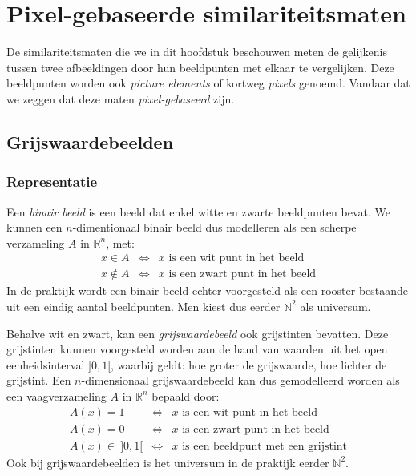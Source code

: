 \chapter{Pixel-gebaseerde similariteitsmaten}

De similariteitsmaten die we in dit hoofdstuk beschouwen
meten de gelijkenis tussen twee afbeeldingen door hun beeldpunten met elkaar te vergelijken.
Deze beeldpunten worden ook \emph{picture elements} of kortweg \emph{pixels} genoemd. Vandaar
dat we zeggen dat deze maten \emph{pixel-gebaseerd} zijn.

\section{Grijswaardebeelden}

\subsection{Representatie}

Een \emph{binair beeld} is een beeld dat enkel witte en zwarte beeldpunten bevat. We kunnen een 
$n$-dimentionaal binair beeld dus modelleren als een scherpe verzameling $A$ in $\mathbb{R}^n$, met:
$$
\begin{array}{rcl}
x \in A & \iff & x \textrm{ is een wit punt in het beeld} \\
x \notin A & \iff & x \textrm{ is een zwart punt in het beeld}
\end{array}
$$ 
In de praktijk wordt een binair beeld echter voorgesteld als een rooster bestaande uit een
eindig aantal beeldpunten. Men kiest dus eerder $\mathbb{N}^2$ als universum.

Behalve wit en zwart, kan een \emph{grijswaardebeeld} ook grijstinten bevatten. Deze grijstinten
kunnen voorgesteld worden aan de hand van waarden uit het open eenheidsinterval $]0,1[$, waarbij
geldt: hoe groter de grijswaarde, hoe lichter de grijstint. Een $n$-dimensionaal grijswaardebeeld
kan dus gemodelleerd worden als een vaagverzameling $A$ in $\mathbb{R}^n$ bepaald door:
$$
\begin{array}{rcl}
A(x) = 1 & \iff & x \textrm{ is een wit punt in het beeld} \\
A(x) = 0 & \iff & x \textrm{ is een zwart punt in het beeld} \\
A(x) \in\ ]0,1[ & \iff & x \textrm{ is een beeldpunt met een grijstint}
\end{array}
$$
Ook bij grijswaardebeelden is het universum in de praktijk eerder $\mathbb{N}^2$.

